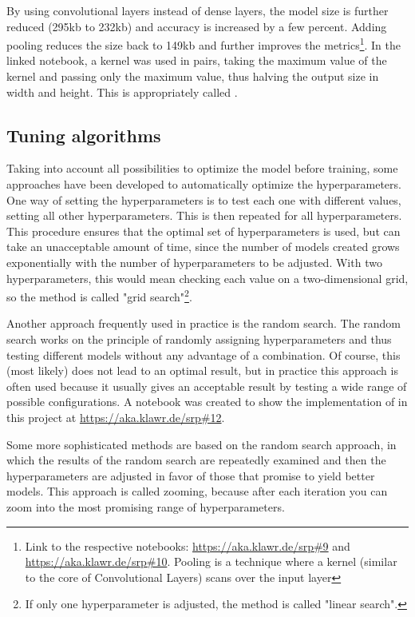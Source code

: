 By using convolutional layers instead of dense layers, the model size is further reduced (295kb to 232kb) and accuracy is increased by a few percent. Adding pooling reduces the size back to 149kb and further improves the metrics\footnote{Link to the respective notebooks: \url{https://aka.klawr.de/srp\#9} and \url{https://aka.klawr.de/srp\#10}.
Pooling is a technique where a kernel (similar to the core of Convolutional Layers) scans over the input layer}.
In the linked notebook, a kernel was used in pairs, taking the maximum value of the kernel and passing only the maximum value, thus halving the output size in width and height.
This is appropriately called .

\subsection{Tuning algorithms}

Taking into account all possibilities to optimize the model before training, some approaches have been developed to automatically optimize the hyperparameters.
One way of setting the hyperparameters is to test each one with different values, setting all other hyperparameters.
This is then repeated for all hyperparameters.
This procedure ensures that the optimal set of hyperparameters is used, but can take an unacceptable amount of time, since the number of models created grows exponentially with the number of hyperparameters to be adjusted.
With two hyperparameters, this would mean checking each value on a two-dimensional grid, so the method is called "grid search"\footnote{If only one hyperparameter is adjusted, the method is called "linear search".}.

Another approach frequently used in practice is the random search.
The random search works on the principle of randomly assigning hyperparameters and thus testing different models without any advantage of a combination.
Of course, this (most likely) does not lead to an optimal result, but in practice this approach is often used because it usually gives an acceptable result by testing a wide range of possible configurations.
A notebook was created to show the implementation of  in this project at \url{https://aka.klawr.de/srp\#12}.

Some more sophisticated methods are based on the random search approach, in which the results of the random search are repeatedly examined and then the hyperparameters are adjusted in favor of those that promise to yield better models.
This approach is called zooming, because after each iteration you can zoom into the most promising range of hyperparameters.


